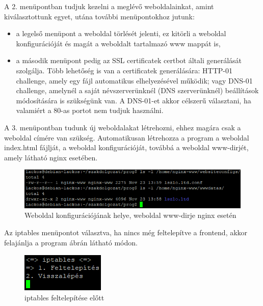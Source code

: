 A 2. menüpontban tudjuk kezelni a meglévő weboldalainkat, amint kiválasztottunk egyet, utána további menüpontokhoz jutunk:

\begin{itemize}
	\item a legelső menüpont a weboldal törlését jelenti, ez kitörli a weboldal konfigurációját és magát a weboldalt tartalmazó www mappát is,
	\item a második menüpont pedig az SSL certificatek certbot általi generálását szolgálja.
	Több lehetőség is van a certificatek generálására: HTTP-01 challenge, amely egy fájl automatikus elhelyezésével működik; vagy DNS-01 challenge, amelynél a saját névszerverünknél (DNS szerverünknél) beállítások módosítására is szükségünk van. A DNS-01-et akkor célszerű választani, ha valamiért a 80-as portot nem tudjuk használni.
\end{itemize}

A 3. menüpontban tudunk új weboldalakat létrehozni, ehhez magára csak a weboldal címére van szükség. Automatikusan létrehozza a program a weboldal index.html fájlját, a weboldal konfigurációját, továbbá a weboldal www-dirjét, amely  látható nginx esetében.

\begin{figure}[h]
\centering
\includegraphics[scale=1]{images/website_config_dir_examples.png}
\caption{Weboldal konfigurációjának helye, weboldal www-dirje nginx esetén}
\label{fig:website_config_dir_examples}
\end{figure}

\pagebreak


Az iptables menüpontot választva, ha nincs még feltelepítve a frontend, akkor felajánlja a program  ábrán látható módon.

\begin{figure}[h]
\centering
\includegraphics[scale=1]{images/iptables_before_install.png}
\caption{iptables feltelepítése előtt}
\label{fig:iptables_before_install}
\end{figure}

